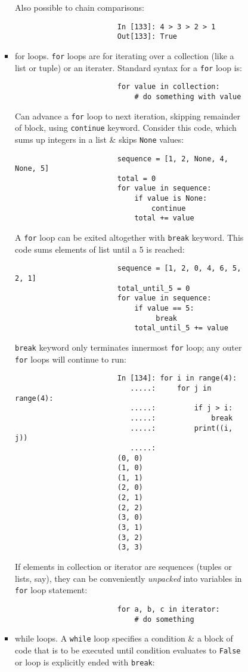 \documentclass{article}
\begin{document}
\begin{enumerate}
\begin{itemize}
\begin{itemize}
\begin{itemize}
\begin{itemize}
					Also possible to chain comparisons:
					\begin{verbatim}
						In [133]: 4 > 3 > 2 > 1
						Out[133]: True
					\end{verbatim}
					\item {\sf for loops.} {\tt for} loops are for iterating over a collection (like a list or tuple) or an iterater. Standard syntax for a {\tt for} loop is:
					\begin{verbatim}
						for value in collection:
						    # do something with value
					\end{verbatim}
					Can advance a {\tt for} loop to next iteration, skipping remainder of block, using {\tt continue} keyword. Consider this code, which sums up integers in a list \& skips {\tt None} values:
					\begin{verbatim}
						sequence = [1, 2, None, 4, None, 5]
						total = 0
						for value in sequence:
						    if value is None:
						        continue
						    total += value
					\end{verbatim}
					A {\tt for} loop can be exited altogether with {\tt break} keyword. This code sums elements of list until a 5 is reached:
					\begin{verbatim}
						sequence = [1, 2, 0, 4, 6, 5, 2, 1]
						total_until_5 = 0
						for value in sequence:
						    if value == 5:
						         break
						    total_until_5 += value
					\end{verbatim}
					{\tt break} keyword only terminates innermost {\tt for} loop; any outer {\tt for} loops will continue to run:
					\begin{verbatim}
						In [134]: for i in range(4):
						   .....:     for j in range(4):
						   .....:         if j > i:
						   .....:             break
						   .....:         print((i, j))
						   .....:
						(0, 0)
						(1, 0)
						(1, 1)
						(2, 0)
						(2, 1)
						(2, 2)
						(3, 0)
						(3, 1)
						(3, 2)
						(3, 3)
					\end{verbatim}
					If elements in collection or iterator are sequences (tuples or lists, say), they can be conveniently {\it unpacked} into variables in {\tt for} loop statement:
					\begin{verbatim}
						for a, b, c in iterator:
						    # do something
					\end{verbatim}
					\item {\sf while loops.} A {\tt while} loop specifies a condition \& a block of code that is to be executed until condition evaluates to {\tt False} or loop is explicitly ended with {\tt break}:

\end{itemize}
\end{itemize}
\end{itemize}
\end{itemize}
\end{enumerate}
\end{document}
